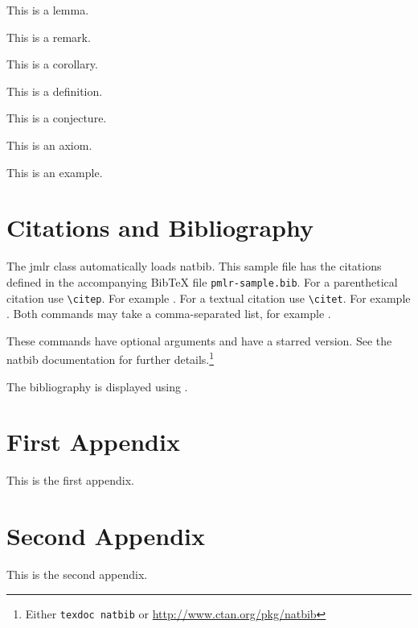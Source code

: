 \documentclass[pmlr]{jmlr}%
\begin{document}
\begin{lemma}\label{lem:sample}
This is a lemma.
\end{lemma}

\begin{remark}\label{rem:sample}
This is a remark.
\end{remark}

\begin{corollary}\label{cor:sample}
This is a corollary.
\end{corollary}

\begin{definition}\label{def:sample}
This is a definition.
\end{definition}

\begin{conjecture}\label{con:sample}
This is a conjecture.
\end{conjecture}

\begin{axiom}\label{ax:sample}
This is an axiom.
\end{axiom}

\begin{example}[An Example]\label{ex:sample}
This is an example.
\end{example}

\section{Citations and Bibliography}
\label{sec:cite}

The \textsf{jmlr} class automatically loads \textsf{natbib}.
This sample file has the citations defined in the accompanying
BibTeX file \texttt{pmlr-sample.bib}. For a parenthetical
citation use \verb|\citep|. For example
\citep{guyon-elisseeff-03}. For a textual citation use
\verb|\citet|. For example \citet{guyon2007causalreport}.
Both commands may take a comma-separated list, for example
\citet{guyon-elisseeff-03,guyon2007causalreport}.

These commands have optional arguments and have a starred
version. See the \textsf{natbib} documentation for further
details.\footnote{Either \texttt{texdoc natbib} or
\url{http://www.ctan.org/pkg/natbib}}

The bibliography is displayed using \verb||.




\appendix

\section{First Appendix}\label{apd:first}

This is the first appendix.

\section{Second Appendix}\label{apd:second}

This is the second appendix.
\end{document}
